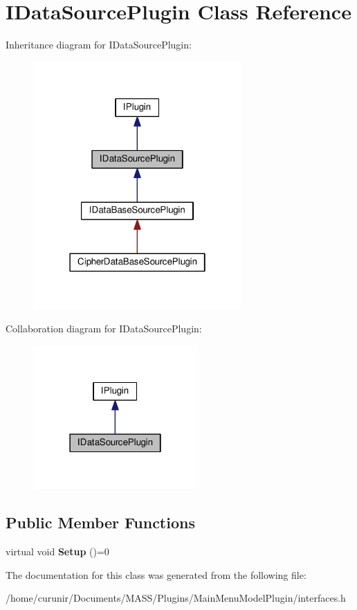 \hypertarget{class_i_data_source_plugin}{}\section{I\+Data\+Source\+Plugin Class Reference}
\label{class_i_data_source_plugin}


Inheritance diagram for I\+Data\+Source\+Plugin\+:\nopagebreak
\begin{figure}[H]
\begin{center}
\leavevmode
\includegraphics[width=226pt]{class_i_data_source_plugin__inherit__graph}
\end{center}
\end{figure}


Collaboration diagram for I\+Data\+Source\+Plugin\+:\nopagebreak
\begin{figure}[H]
\begin{center}
\leavevmode
\includegraphics[width=178pt]{class_i_data_source_plugin__coll__graph}
\end{center}
\end{figure}
\subsection*{Public Member Functions}
\begin{DoxyCompactItemize}
\item 
virtual void {\bfseries Setup} ()=0\hypertarget{class_i_data_source_plugin_afb3d43d4324e8849b1cb244c59a45987}{}\label{class_i_data_source_plugin_afb3d43d4324e8849b1cb244c59a45987}

\end{DoxyCompactItemize}


The documentation for this class was generated from the following file\+:\begin{DoxyCompactItemize}
\item 
/home/curunir/\+Documents/\+M\+A\+S\+S/\+Plugins/\+Main\+Menu\+Model\+Plugin/interfaces.\+h\end{DoxyCompactItemize}
